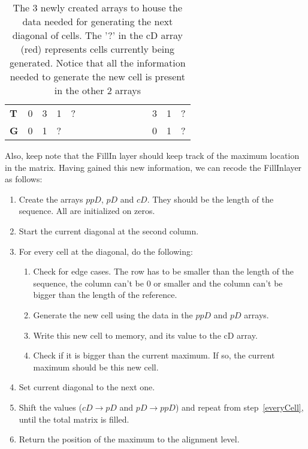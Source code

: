 \begin{table}[H]
\begin{tabular}{|l|lllllllllll|l|l|l|}
		\textbf{T}                      & 0                                 & \cellcolor[HTML]{9AFF99}3       & \cellcolor[HTML]{96FFFB}1       & \cellcolor[HTML]{FFCCC9}?       &                                 &                                 &                                 &                                 &                                 &                 &           & \cellcolor[HTML]{9AFF99}3 & \cellcolor[HTML]{96FFFB}1 & \cellcolor[HTML]{FFCCC9}? \\ \cline{1-1} \cline{13-15} 
		\textbf{G}                      & \cellcolor[HTML]{9AFF99}0         & \cellcolor[HTML]{96FFFB}1       & \cellcolor[HTML]{FFCCC9}?       &                                 &                                 &                                 &                                 &                                 &                                 &                 &           & \cellcolor[HTML]{9AFF99}0 & \cellcolor[HTML]{96FFFB}1 & \cellcolor[HTML]{FFCCC9}? \\ \cline{1-1} \cline{13-15} 
	\end{tabular}
	\caption{The 3 newly created arrays to house the data needed for generating the next diagonal of cells. The '?' in the cD array (red) represents cells currently being generated. Notice that all the information needed to generate the new cell is present in the other 2 arrays}
	\label{tbl:arraytable}
\end{table}

Also, keep note that the FillIn layer should keep track of the maximum location in the matrix. Having gained this new information, we can recode the FillInlayer as follows:

\begin{enumerate}
	\item Create the arrays $ppD$, $pD$ and $cD$. They should be the length of the sequence. All are initialized on zeros.
	\item Start the current diagonal at the second column.
	\item \label{everyCell}For every cell at the diagonal, do the following:
	\begin{enumerate}
		\item Check for edge cases. The row has to be smaller than the length of the sequence, the column can't be 0 or smaller and the column can't be bigger than the length of the reference.
		\item Generate the new cell using the data in the $ppD$ and $pD$ arrays.
		\item Write this new cell to memory, and its value to the cD array.
		\item Check if it is bigger than the current maximum. If so, the current maximum should be this new cell. 
	\end{enumerate}
	\item Set current diagonal to the next one.
	\item Shift the values ($cD \rightarrow pD$ and $pD \rightarrow ppD$) and repeat from step~\ref{everyCell}, until the total matrix is filled.
	\item Return the position of the maximum to the alignment level.
\end{enumerate}

